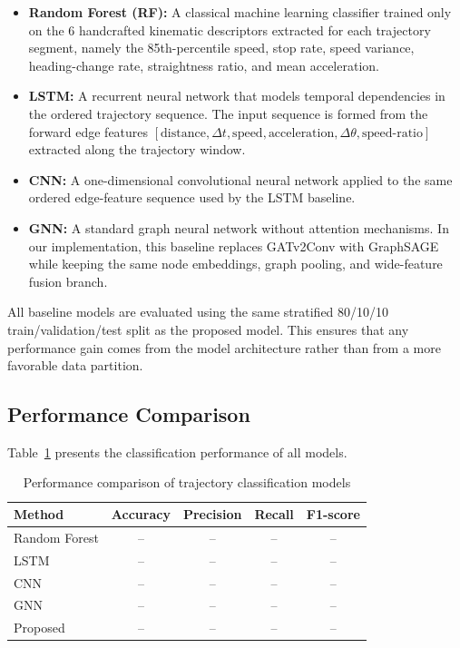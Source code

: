\documentclass[conference]{IEEEtran}
\begin{document}
\begin{itemize}

\item \textbf{Random Forest (RF):} A classical machine learning classifier trained only on the 6 handcrafted kinematic descriptors extracted for each trajectory segment, namely the 85th-percentile speed, stop rate, speed variance, heading-change rate, straightness ratio, and mean acceleration.

\item \textbf{LSTM:} A recurrent neural network that models temporal dependencies in the ordered trajectory sequence. The input sequence is formed from the forward edge features $[\text{distance}, \Delta t, \text{speed}, \text{acceleration}, \Delta \theta, \text{speed-ratio}]$ extracted along the trajectory window.

\item \textbf{CNN:} A one-dimensional convolutional neural network applied to the same ordered edge-feature sequence used by the LSTM baseline.

\item \textbf{GNN:} A standard graph neural network without attention mechanisms. In our implementation, this baseline replaces GATv2Conv with GraphSAGE while keeping the same node embeddings, graph pooling, and wide-feature fusion branch.

\end{itemize}

All baseline models are evaluated using the same stratified 80/10/10 train/validation/test split as the proposed model. This ensures that any performance gain comes from the model architecture rather than from a more favorable data partition.

\subsection{Performance Comparison}

Table~\ref{tab:performance} presents the classification performance of all models.

\begin{table}[t]
\centering
\caption{Performance comparison of trajectory classification models}
\label{tab:performance}
\begin{tabular}{lcccc}
\toprule
Method & Accuracy & Precision & Recall & F1-score \\
\midrule
Random Forest & -- & -- & -- & -- \\
LSTM & -- & -- & -- & -- \\
CNN & -- & -- & -- & -- \\
GNN & -- & -- & -- & -- \\
Proposed & -- & -- & -- & -- \\
\bottomrule
\end{tabular}
\end{table}
\end{document}
